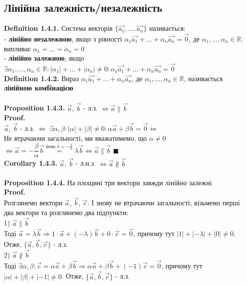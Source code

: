 \documentclass[a4paper, 14pt]{extarticle}
\def\defin#1{\textbf{Definition {#1}}}
\def\prp#1{\textbf{Proposition {#1}}}
\def\crl#1{\textbf{Corollary {#1}}}
\def\proof{\textbf{Proof.}\\}
\def\bigline{\vspace{5mm}\\}
\def\qed{$\blacksquare$}
\begin{document}
	
	\subsection{Лінійна залежність/незалежність}
	\defin{1.4.1.} Система векторів $\{\vec{a_1}, \dots, \vec{a_n}\}$ називається:\\
	- \textbf{лінійно незалежною}, якщо з рівності $\alpha_1 \vec{a_1} + \dots + \alpha_n \vec{a_n} = \vec{0}$, де $\alpha_1, \dots, \alpha_n \in \mathbb{R}$, випливає $\alpha_1 = \dots = \alpha_n = 0$\\
	- \textbf{лінійно залежною}, якщо $\exists \alpha_1, \dots, \alpha_n \in \mathbb{R}: |\alpha_1| + \dots + |\alpha_n| \neq 0: \alpha_1 \vec{a_1} + \dots + \alpha_n \vec{a_n} = \vec{0}$
	\bigline
	\defin{1.4.2.} Вираз $\alpha_1 \vec{a_1} + \dots + \alpha_n \vec{a_n}$, де $\alpha_1, \dots, \alpha_n \in \mathbb{R}$, називається \textbf{лінійною комбінацією}\\
	\bigline
	\prp{1.4.3.} $\vec{a}$, $\vec{b}$ - л.з. $\iff \vec{a} \parallel \vec{b}$\\
	\proof
	$\vec{a}$, $\vec{b}$ - л.з. $\iff$ $\exists \alpha, \beta: |\alpha| + |\beta| \neq 0:
	\alpha \vec{a} + \beta \vec{b} = \vec{0} \iff$\\
	Не втрачаючи загальності, ми вважатимемо, що $\alpha \neq 0$\\
	$\iff \vec{a} = -\dfrac{\beta}{\alpha} \vec{b} \overset{\textrm{позн.} \lambda = -\frac{\beta}{\alpha}}{=} \lambda \vec{b} \iff \vec{a} \parallel \vec{b}$ \qed
	\bigline
	\crl{1.4.3.} $\vec{a}$, $\vec{b}$ - л.н.з. $\iff \vec{a} \not\parallel \vec{b}$\\
	\bigline
	\prp{1.4.4.} На площині три вектори завжди лінійно залежні\\
	\proof
	Розглянемо вектори $\vec{a}$, $\vec{b}$, $\vec{c}$. І знову не втрачаючи загальності, візьмемо перші два вектори та розглянемо два підпункти:\\
	1) $\vec{a} \parallel \vec{b}$\\
	Тоді $\vec{a} = \lambda \vec{b} \Rightarrow 1 \cdot \vec{a} + (-\lambda) \vec{b} + 0 \cdot \vec{c} = \vec{0}$, причому тут $|1|+|-\lambda|+|0| \neq 0$. Отже, $\{\vec{a}, \vec{b}, \vec{c}\}$ - л.з.\\
	2) $\vec{a} \not\parallel \vec{b}$\\
	Тоді $\exists \alpha, \beta: \vec{c} = \alpha \vec{a} + \beta \vec{b} \Rightarrow \alpha \vec{a} + \beta \vec{b} + (-1) \vec{c} = \vec{0}$, причому тут $|\alpha| + |\beta| + |-1| \neq 0$. Отже, $\{\vec{a}, \vec{b}, \vec{c}\}$ - л.з.\\
\end{document}
